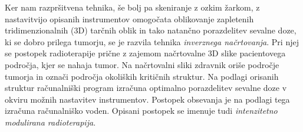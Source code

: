 \documentclass[a4paper,twoside,11pt]{article}
\begin{document}
	\par{
	  Ker nam razpršitvena tehnika, še bolj pa skeniranje z ozkim žarkom, z nastavitvijo opisanih instrumentov omogočata oblikovanje zapletenih tridimenzionalnih (3D) tarčnih oblik in tako natančno porazdelitev sevalne doze, ki se dobro prilega tumorju, se je razvila tehnika \emph{inverznega načrtovanja}. Pri njej se postopek radioterapije prične z zajemom načrtovalne 3D slike pacientovega področja, kjer se nahaja tumor. Na načrtovalni sliki zdravnik oriše področje tumorja in označi področja okoliških kritičnih struktur. Na podlagi orisanih struktur računalniški program izračuna optimalno porazdelitev sevalne doze v okviru možnih nastavitev instrumentov. Postopek obsevanja je na podlagi tega izračuna računalniško voden. Opisani postopek se imenuje tudi \emph{intenzitetno modulirana radioterapija}. \cite{jaffray2012}
	}
\end{document}
